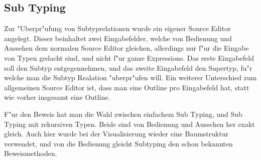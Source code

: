 \subsection{Sub Typing}
Zur "Uberpr"ufung von Subtyprelationen wurde ein eigener Source Editor angelegt. Dieser beinhaltet zwei Eingabefelder,
welche von Bedienung und Aussehen dem normalen Source Editor gleichen, allerdings nur f"ur die Eingabe von Typen gedacht
sind, und nicht f"ur ganze Expressions. Das erste Eingabefeld soll den Subtyp entgegennehmen, und das zweite Eingabefeld 
den Supertyp, fu"r welche man die Subtyp Realation "uberpr"ufen will. Ein weiterer Unterschied zum allgemeinen Source 
Editor ist, dass man eine Outline pro Eingabefeld hat, statt wie vorher insgesamt eine Outline.

F"ur den Beweis hat man die Wahl zwischen einfachem Sub Typing, und Sub Typing mit rekursiven Typen. Beide sind von 
Bedienung und Aussehen her exakt gleich. Auch hier wurde bei der Visualisierung wieder eine Baumstruktur verwendet,
und von die Bedienung gleicht Subtyping den schon bekannten Beweismethoden. 



